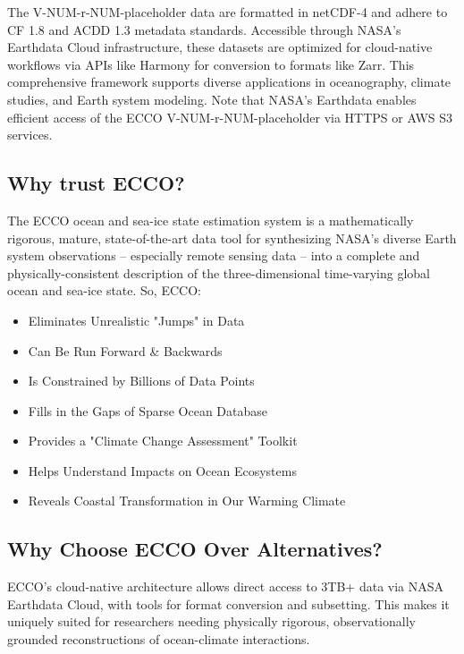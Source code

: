 \par\vspace{0.25cm}
The V-NUM-r-NUM-placeholder data are formatted in netCDF-4 and adhere to CF 1.8 and ACDD 1.3 metadata standards. Accessible through NASA's Earthdata Cloud infrastructure, these datasets are optimized for cloud-native workflows via APIs like Harmony for conversion to formats like Zarr. This comprehensive framework supports diverse applications in oceanography, climate studies, and Earth system modeling. Note that NASA's Earthdata enables efficient access of the ECCO V-NUM-r-NUM-placeholder via HTTPS or AWS S3 services.

\subsection{Why trust ECCO?}
\par\vspace{0.25cm}
The ECCO ocean and sea-ice state estimation system is a mathematically rigorous, mature, state-of-the-art data tool for synthesizing NASA's diverse Earth system observations – especially remote sensing data – into a complete and physically-consistent description of the three-dimensional time-varying global ocean and sea-ice state.
\vspace{0.25cm}
So, ECCO:
\begin{itemize}
\item Eliminates Unrealistic "Jumps" in Data
\item Can Be Run Forward \& Backwards
\item Is Constrained by Billions of Data Points
\item Fills in the Gaps of Sparse Ocean Database
\item Provides a "Climate Change Assessment" Toolkit
\item Helps Understand Impacts on Ocean Ecosystems
\item Reveals Coastal Transformation in Our Warming Climate
\end{itemize}

\subsection{Why Choose ECCO Over Alternatives?}
\par\vspace{0.25cm}
ECCO's cloud-native architecture allows direct access to 3TB+ data via NASA Earthdata Cloud, with tools for format conversion and subsetting. This makes it uniquely suited for researchers needing physically rigorous, observationally grounded reconstructions of ocean-climate interactions.
\vspace{0.25cm}


